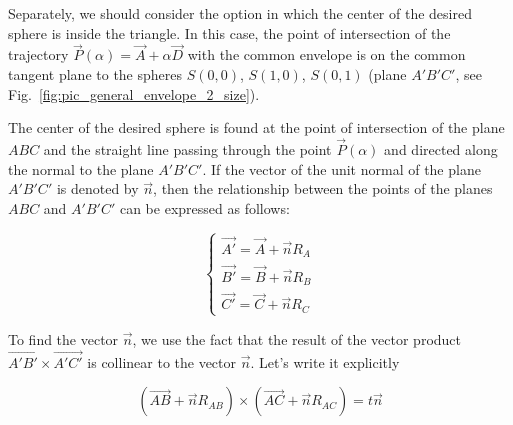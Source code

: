 \documentclass[
11pt,%
tightenlines,%
twoside,%
onecolumn,%
nofloats,%
nobibnotes,%
nofootinbib,%
superscriptaddress,%
noshowpacs,%
centertags]%
{revtex4}
\begin{document}
Separately, we should consider the option in which the center of the desired sphere is inside the triangle.
In this case, the point of intersection of the trajectory $\vec{P}(\alpha) = \vec{A} + \alpha \vec{D}$ with the common envelope is on the common tangent plane to the spheres $S(0, 0)$, $S(1, 0)$, $S(0, 1)$ (plane $A'B'C'$, see Fig.~\ref{fig:pic_general_envelope_2_size}).

The center of the desired sphere is found at the point of intersection of the plane $ABC$ and the straight line passing through the point $\vec{P}(\alpha)$ and directed along the normal to the plane $A'B'C'$.
If the vector of the unit normal of the plane $A'B'C'$ is denoted by $\vec{n}$, then the relationship between the points of the planes $ABC$ and $A'B'C'$ can be expressed as follows:

\begin{equation}
\begin{cases}
\vec{A'} = \vec{A} + \vec{n} R_A \\
\vec{B'} = \vec{B} + \vec{n} R_B \\
\vec{C'} = \vec{C} + \vec{n} R_C
\end{cases}
\end{equation}

To find the vector $\vec{n}$, we use the fact that the result of the vector product $\vec{A'B'} \times \vec{A'C'}$ is collinear to the vector $\vec{n}$.
Let's write it explicitly

\begin{equation}
(\vec{AB} + \vec{n} R_{AB}) \times (\vec{AC} + \vec{n} R_{AC}) = t \vec{n}
\end{equation}
\end{document}
